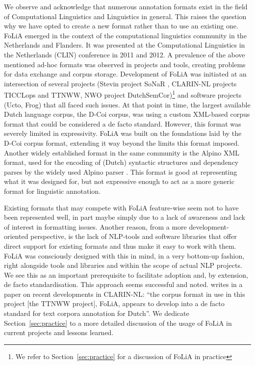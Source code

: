 \documentclass[a4paper,10pt,twoside]{article}
\begin{document}
We observe and acknowledge that numerous annotation formats exist in the field
of Computational Linguistics and Linguistics in general. This raises the
question why we have opted to create a new format rather than to use an
existing one. FoLiA emerged in the context of the computational linguistics
community in the Netherlands and Flanders. It was presented at the
Computational Linguistics in the Netherlands (CLIN) conference in 2011 and
2012. A prevalence of the above mentioned ad-hoc formats was observed in
projects and tools, creating problems for data exchange and corpus storage.
Development of FoLiA was initiated at an intersection of several projects
(Stevin project SoNaR \cite{StevinSONAR2013}, CLARIN-NL projects TICCLops and
TTNWW, NWO project DutchSemCor)\footnote{We refer to Section~\ref{sec:practice}
for a discussion of FoLiA in practice} and software projects (Ucto, Frog) that
all faced such issues. At that point in time, the largest available Dutch
language corpus, the D-Coi corpus, was using a custom XML-based corpus format
\cite{DCOI} that could be considered a de facto standard. However, this format
was severely limited in expressivity.  FoLiA was built on the foundations laid
by the D-Coi corpus format, extending it way beyond the limits this format
imposed. Another widely established format in the same community is the Alpino
XML format, used for the encoding of (Dutch) syntactic structures and
dependency parses by the widely used Alpino parser \cite{ALPINO}. This format
is good at representing what it was designed for, but not expressive enough to
act as a more generic format for linguistic annotation.

Existing formats that may compete with FoLiA feature-wise seem not to have been
represented well, in part maybe simply due to a lack of awareness and lack of interest in
formatting issues. Another reason, from a more development-oriented
perspective, is the lack of NLP-tools and software libraries that offer direct
support for existing formats and thus make it easy to work with them. FoLiA was
consciously designed with this in mind, in a very
bottom-up fashion, right alongside tools and libraries and within the scope of
actual NLP projects. We see this as an important prerequisite to facilitate
adoption and, by extension, de facto standardisation. This approach seems
successful and noted.  writes in a paper on recent developments
in CLARIN-NL: ``the corpus format in use in this project [the TTNWW project],
FoLiA, appears to develop into a de facto standard for text corpora annotation
for Dutch''. We dedicate Section~\ref{sec:practice} to a more detailed
discussion of the usage of FoLiA in current projects and lessons learned.
\end{document}
